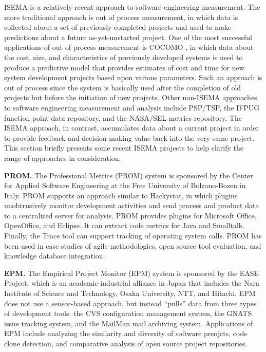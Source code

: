 \documentclass[10pt,twocolumn]{article}
\begin{document}

ISEMA is a relatively recent approach to software engineering measurement.
The more traditional approach is out of process measurement, in which data
is collected about a set of previously completed projects and used to make
predictions about a future as-yet-unstarted project.  One of the most
successful applications of out of process measurement is COCOMO
\cite{Boehm00}, in which data about the cost, size, and characteristics of
previously developed systems is used to produce a predictive model that
provides estimates of cost and time for new system development projects
based upon various parameters.  Such an approach is out of process since
the system is basically used after the completion of old projects but
before the initiation of new projects.  Other non-ISEMA approaches to
software engineering measurement and analysis include PSP/TSP, the IFPUG
function point data repository, and the NASA/SEL metrics repository. The
ISEMA approach, in contrast, accumulates data about a current project in
order to provide feedback and decision-making value back into the very same
project. This section briefly presents some recent ISEMA projects to help
clarify the range of approaches in consideration.

{\bf PROM.} The Professional Metrics (PROM) system \cite{PROM} is sponsored
by the Center for Applied Software Engineering at the Free University of
Bolzano-Bozen in Italy. PROM supports an approach similar to Hackystat, in which
plugins unobtrusively monitor development activities and send process and
product data to a centralized server for analysis.  PROM provides plugins
for Microsoft Office, OpenOffice, and Eclipse. It can
extract code metrics for Java and Smalltalk. Finally, the Trace tool can
support tracking of operating system calls.  PROM has been used in case
studies of agile methodologies, open source tool evaluation, and knowledge
database integration.

{\bf EPM.} The Empirical Project Monitor (EPM) system \cite{EPM} is
sponsored by the EASE Project, which is an academic-industrial alliance in
Japan that includes the Nara Institute of Science and Technology, Osaka
University, NTT, and Hitachi.  EPM does not use a sensor-based approach,
but instead ``pulls'' data from three types of development tools: the CVS
configuration management system, the GNATS issue tracking system, and the
MailMan mail archiving system. Applications of EPM include analyzing the 
similarity and diversity of software preojcts, code clone detection, and 
comparative analysis of open source project repositories.
\end{document}
